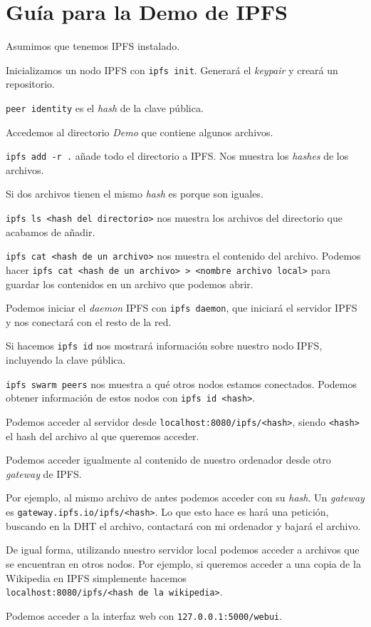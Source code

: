 \documentclass[12pt]{article} %
\begin{document}
\section*{Guía para la Demo de IPFS}

Asumimos que tenemos IPFS instalado.

Inicializamos un nodo IPFS con \texttt{ipfs\ init}. Generará el
\emph{keypair} y creará un repositorio.

\texttt{peer\ identity} es el \emph{hash} de la clave pública.

Accedemos al directorio \textit{Demo} que contiene algunos archivos.

\texttt{ipfs\ add\ -r\ .} añade todo el directorio a IPFS. Nos muestra
los \emph{hashes} de los archivos.

Si dos archivos tienen el mismo \emph{hash} es porque son iguales.

\texttt{ipfs\ ls\ \textless{}hash\ del\ directorio\textgreater{}} nos
muestra los archivos del directorio que acabamos de añadir.

\texttt{ipfs\ cat\ \textless{}hash\ de\ un\ archivo\textgreater{}} nos
muestra el contenido del archivo. Podemos hacer
\texttt{ipfs\ cat\ \textless{}hash\ de\ un\ archivo\textgreater{}\ \textgreater{}\ \textless{}nombre\ archivo\ local\textgreater{}}
para guardar los contenidos en un archivo que podemos abrir.

Podemos iniciar el \emph{daemon} IPFS con \texttt{ipfs\ daemon}, que
iniciará el servidor IPFS y nos conectará con el resto de la red.

Si hacemos \texttt{ipfs\ id} nos mostrará información sobre nuestro nodo
IPFS, incluyendo la clave pública.

\texttt{ipfs\ swarm\ peers} nos muestra a qué otros nodos estamos
conectados. Podemos obtener información de estos nodos con
\texttt{ipfs\ id\ \textless{}hash\textgreater{}}.

Podemos acceder al servidor desde
\texttt{localhost:8080/ipfs/\textless{}hash\textgreater{}}, siendo
\texttt{\textless{}hash\textgreater{}} el hash del archivo al que
queremos acceder.

Podemos acceder igualmente al contenido de nuestro ordenador desde otro
\emph{gateway} de IPFS.

Por ejemplo, al mismo archivo de antes podemos acceder con su
\emph{hash}. Un \emph{gateway} es
\texttt{gateway.ipfs.io/ipfs/\textless{}hash\textgreater{}}. Lo que esto
hace es hará una petición, buscando en la DHT el archivo, contactará con
mi ordenador y bajará el archivo.

De igual forma, utilizando nuestro servidor local podemos acceder a
archivos que se encuentran en otros nodos. Por ejemplo, si queremos
acceder a una copia de la Wikipedia en IPFS simplemente hacemos
\texttt{localhost:8080/ipfs/\textless{}hash\ de\ la\ wikipedia\textgreater{}}.

Podemos acceder a la interfaz web con \texttt{127.0.0.1:5000/webui}.
\end{document}
